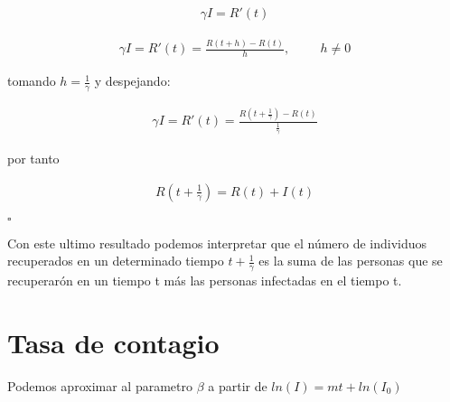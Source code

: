 \begin{Dem}
\begin{align*}
\gamma I = R'(t)
\end{align*}

\begin{align*}
\gamma I = R'(t) = \frac{R\left( t + h \right) - R\left(t\right)}{h}, \hspace{1cm} h \neq 0
\end{align*}

tomando $h = \frac{1}{\gamma}$ y despejando: 

\begin{align*}
\gamma I = R'(t) = \frac{R\left( t + \frac{1}{\gamma} \right) - R\left(t\right)}{\frac{1}{\gamma}}
\end{align*}

por tanto

\begin{align*}
R\left( t + \frac{1}{\gamma} \right) = R(t) + I(t)
\end{align*}

\hfill	$\square$
\end{Dem}

Con este ultimo resultado podemos interpretar que el número de individuos recuperados en un determinado tiempo $t + \frac {1}{\gamma}$  es la suma de las personas que se recuperarón en un tiempo t más las personas infectadas en el tiempo t.

\newpage

\section{Tasa de contagio}

\begin{Af}
Podemos aproximar al parametro $\beta$ a partir de $ln(I) = mt + ln(I_{0})$ \cite{Algeria}
\end{Af}

